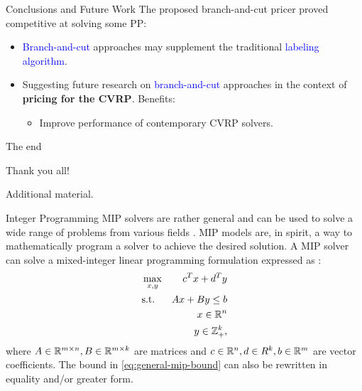 \begin{frame}{Conclusions and Future Work}
	The proposed branch-and-cut pricer proved competitive at solving some PP:
	\begin{itemize}
		\item \textcolor{blue}{Branch-and-cut} approaches may supplement the traditional \textcolor{blue}{labeling algorithm}.
		\item Suggesting future research on \textcolor{blue}{branch-and-cut} approaches in the context of \textbf{pricing for the CVRP}.
		      Benefits:
		      \begin{itemize}
			      \item Improve performance of contemporary CVRP solvers.
		      \end{itemize}
	\end{itemize}
\end{frame}

\begin{frame}{The end}
	\begin{center}
		\begingroup
		\fontsize{18pt}{18pt}\selectfont
		Thank you all!
		\endgroup
	\end{center}
\end{frame}

\appendix

\begin{frame}
\end{frame}

\begin{frame}
	\begin{center}
		\begingroup
		\fontsize{18pt}{18pt}\selectfont
		Additional material.
		\endgroup
	\end{center}
\end{frame}

\begin{frame}{Integer Programming}
	MIP solvers are rather general and can be used to solve a wide range of problems from various fields \parencite{bixby2007progress}.
	MIP models are, in spirit, a way to mathematically program a solver to achieve the desired solution.
	A MIP solver can solve a mixed-integer linear programming formulation
	expressed as \parencite{wolsey1999integer}:
	\begin{align}
		 & \max_{x, y} & c^T x + d^T y                                 \\
		 & \text{s.t.} & A x + B y \le b  \label{eq:general-mip-bound} \\
		 &             & x \in \mathbb R^n                                    \\
		 &             & y \in \mathbb Z_{+}^k,
	\end{align}
	where $A \in \mathbb R^{m \times n}, B \in \mathbb R^{m \times k}$ are matrices and
	$c \in \mathbb R^n, d \in R^k, b \in \mathbb R^m$ are vector coefficients.
	The bound in \cref{eq:general-mip-bound} can also be rewritten in equality and/or greater form.
\end{frame}

